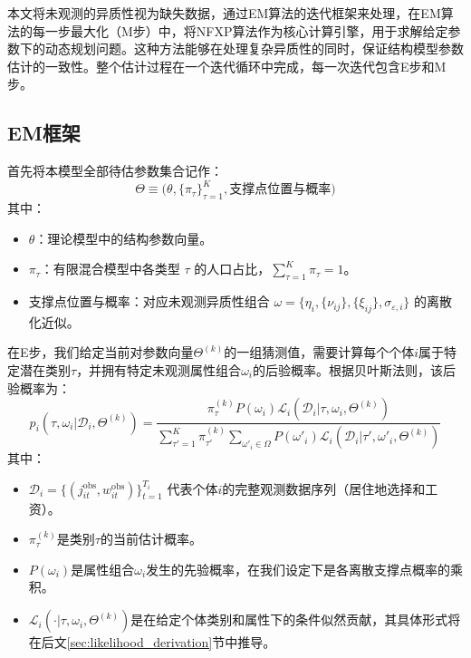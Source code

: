 \documentclass[master, final]{zufe-thesis}
\begin{document}
本文将未观测的异质性视为缺失数据，通过EM算法的迭代框架来处理，在EM算法的每一步最大化（M步）中，将NFXP算法作为核心计算引擎，用于求解给定参数下的动态规划问题。这种方法能够在处理复杂异质性的同时，保证结构模型参数估计的一致性。整个估计过程在一个迭代循环中完成，每一次迭代包含E步和M步。

\subsection{EM框架}

首先将本模型全部待估参数集合记作：
$$
\Theta \equiv \big(\theta, \{\pi_\tau\}_{\tau=1}^K, \text{支撑点位置与概率}\big)
$$
其中：
\begin{itemize}
    \item $\theta$：理论模型中的结构参数向量。
    \item $\pi_\tau$：有限混合模型中各类型 $\tau$ 的人口占比，$\sum_{\tau=1}^K \pi_\tau = 1$。
    \item 支撑点位置与概率：对应未观测异质性组合 $\omega = \{\eta_i, \{\nu_{ij}\}, \{\xi_{ij}\}, \sigma_{\varepsilon,i}\}$ 的离散化近似。
\end{itemize}

在E步，我们给定当前对参数向量$\Theta^{(k)}$的一组猜测值，需要计算每个个体$i$属于特定潜在类别$\tau$，并拥有特定未观测属性组合$\omega_i$的后验概率。根据贝叶斯法则，该后验概率为：
\begin{equation}
    p_{i}(\tau, \omega_i | \mathcal{D}_i, \Theta^{(k)}) = \frac{\pi_\tau^{(k)} P(\omega_i) \mathcal{L}_i(\mathcal{D}_i | \tau, \omega_i, \Theta^{(k)})}{\sum_{\tau'=1}^K \pi_{\tau'}^{(k)} \sum_{\omega'_i \in \Omega} P(\omega'_i) \mathcal{L}_i(\mathcal{D}_i | \tau', \omega'_i, \Theta^{(k)})}
\end{equation}
其中：
\begin{itemize}
    \item $\mathcal{D}_i = \{(j_{it}^{\text{obs}}, w_{it}^{\text{obs}})\}_{t=1}^{T_i}$ 代表个体$i$的完整观测数据序列（居住地选择和工资）。
    \item $\pi_\tau^{(k)}$是类别$\tau$的当前估计概率。
    \item $P(\omega_i)$是属性组合$\omega_i$发生的先验概率，在我们设定下是各离散支撑点概率的乘积。
    \item $\mathcal{L}_i(\cdot | \tau, \omega_i, \Theta^{(k)})$是在给定个体类别和属性下的条件似然贡献，其具体形式将在后文\ref{sec:likelihood_derivation}节中推导。
\end{itemize}
\end{document}
